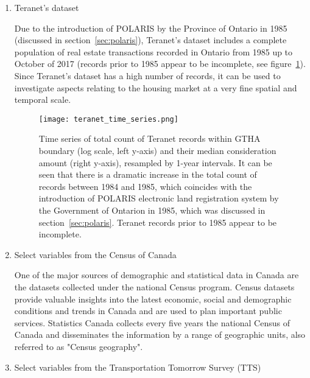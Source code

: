 \begin{enumerate}
    \item Teranet's dataset

    Due to the introduction of POLARIS by the Province of Ontario in 1985 (discussed in section~\ref{sec:polaris}), Teranet's dataset includes a complete population of real estate transactions recorded in Ontario from 1985 up to October of 2017 (records prior to 1985 appear to be incomplete, see figure~\ref{fig:teranet_time_series}).
    Since Teranet's dataset has a high number of records, it can be used to investigate aspects relating to the housing market at a very fine spatial and temporal scale.


    \begin{figure}[hbt!]
        \centering
        \texttt{[image: teranet\_time\_series.png]}
        \caption{Time series of total count of Teranet records within GTHA boundary (log scale, left y-axis) and their median consideration amount (right y-axis), resampled by 1-year intervals.
        It can be seen that there is a dramatic increase in the total count of records between 1984 and 1985, which coincides with the introduction of POLARIS electronic land registration system by the Government of Ontarion in 1985, which was discussed in section~\ref{sec:polaris}.
        Teranet records prior to 1985 appear to be incomplete.}
        \label{fig:teranet_time_series}
    \end{figure}

    \item Select variables from the Census of Canada

    One of the major sources of demographic and statistical data in Canada are the datasets collected under the national Census program.
    Census datasets provide valuable insights into the latest economic, social and demographic conditions and trends in Canada and are used to plan important public services.
    Statistics Canada collects every five years the national Census of Canada and disseminates the information by a range of geographic units, also referred to as "Census geography"\cite{MapandDataLibrary2019}.

    \item Select variables from the Transportation Tomorrow Survey (TTS)


\end{enumerate}
